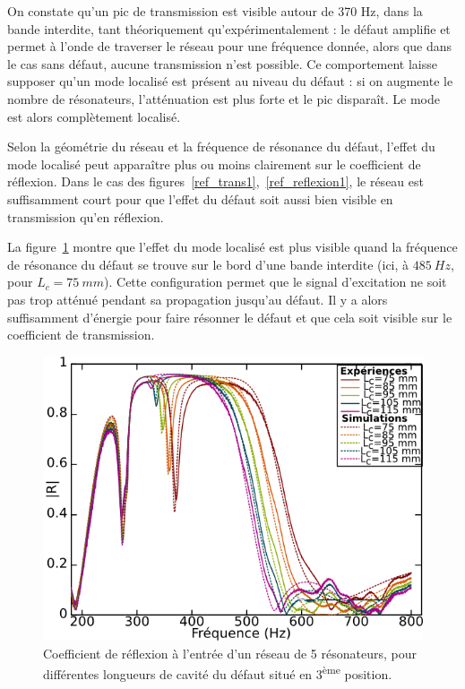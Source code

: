 On constate qu'un pic de transmission est visible autour de 370 Hz, dans la bande interdite, tant théoriquement qu'expérimentalement : le défaut amplifie et permet à l'onde de traverser le réseau pour une fréquence donnée, alors que dans le cas sans défaut, aucune transmission n'est possible. Ce comportement laisse supposer qu'un mode localisé est présent au niveau du défaut : si on augmente le nombre de résonateurs, l'atténuation est plus forte et le pic disparaît. Le mode est alors complètement localisé. 

Selon la géométrie du réseau et la fréquence de résonance du défaut, l'effet du mode localisé peut apparaître plus ou moins clairement sur le coefficient de réflexion. Dans le cas des figures~\ref{ref_trans1},~\ref{ref_reflexion1}, le réseau est suffisamment court pour que l'effet du défaut soit aussi bien visible en transmission qu'en réflexion.

La figure~\ref{multiR} montre que l'effet du mode localisé est plus visible quand la fréquence de résonance du défaut se trouve sur le bord d'une bande interdite (ici, à $485~Hz$, pour $L_c=75~mm$). Cette configuration permet que le signal d'excitation ne soit pas trop atténué pendant sa propagation jusqu'au défaut. Il y a alors suffisamment d'énergie pour faire résonner le défaut et que cela soit visible sur le coefficient de transmission.

\begin{figure}[!h]
	\centering
	\includegraphics[scale=0.5]{./images_chp3/multiR.png}
	\caption{\label{multiR}Coefficient de réflexion à l'entrée d'un réseau de 5 résonateurs, pour différentes longueurs de cavité du défaut situé en 3\textsuperscript{ème} position.}
\end{figure}



